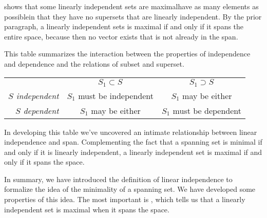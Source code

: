  shows that some 
linearly independent sets are maximal\Dash have as many elements as 
possible\Dash in
that they have no supersets that are linearly independent.
By the prior paragraph, 
a linearly independent sets is maximal if and only if it
spans the 
entire space, because then no vector exists that is not already in the span.

This table summarizes the interaction between the properties of independence
and dependence and the relations of subset and superset.
\medskip
\begin{center}
  \begin{tabular}[b]{r|c|c|}
                        \multicolumn{1}{c}{}
                        &\multicolumn{1}{c}{\( S_1\subset S \)}
                        &\multicolumn{1}{c}{\( S_1\supset S \)}      \\
     \cline{2-3}
          \textit{$S$ independent} 
              &\( S_1 \) must be independent   &\( S_1 \) may be either\\
     \cline{2-3}
          \textit{$S$ dependent} 
              &\( S_1 \) may be either &\( S_1 \) must be dependent    \\
     \cline{2-3}
   \end{tabular}
\end{center}
\medskip
In developing this table we've uncovered an
intimate relationship between linear independence and span.
Complementing the fact that
a spanning set is minimal if and only if it is linearly independent,
a linearly independent set is maximal if and only if it spans the space.

In summary,
we have introduced the definition of linear independence to 
formalize the idea of the minimality of a spanning set.
We have developed some properties of this idea.
The most important is , which 
tells us that a linearly independent set is maximal when it spans the space.


